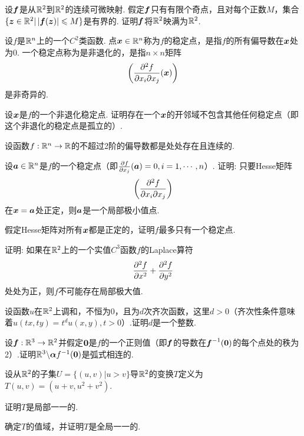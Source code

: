 \documentclass[openany,usenames,dvipsnames]{ctexbook}
\begin{document}
\begin{example}
  设$\boldsymbol f$是从$\mathbb R^2$到$\mathbb R^2$的连续可微映射. 假定$\boldsymbol f$只有有限个奇点，且对每个正数$M$，集合$\{\boldsymbol z\in\mathbb R^2|\,|\boldsymbol f(\boldsymbol z)|\leqslant M\}$是有界的. 证明$\boldsymbol f$将$\mathbb R^2$映满为$\mathbb R^2$.
\end{example}

\begin{example}
  设$f$是$\mathbb R^n$上的一个$C^2$类函数. 点$\boldsymbol x\in\mathbb R^n$称为$f$的稳定点，是指$f$的所有偏导数在$\boldsymbol x$处为0. 一个稳定点称为是非退化的，是指$n\times n$矩阵
  \[
    \bigg( \frac{\partial^2 f}{\partial x_i\partial x_j}(\boldsymbol x) \bigg)
  \]
  是非奇异的.

  设$\boldsymbol x$是$f$的一个非退化稳定点. 证明存在一个$\boldsymbol x$的开邻域不包含其他任何稳定点（即这个非退化的稳定点是孤立的）.
\end{example}

\begin{example}
  设函数$f:\mathbb R^n\to\mathbb R$的不超过2阶的偏导数都是处处存在且连续的.
  \begin{eenum}
    \item 设$\boldsymbol a\in\mathbb R^n$是$f$的一个稳定点（即$\frac{\partial f}{\partial x_j}(\boldsymbol a)=0,i=1,\cdots,n$）. 证明: 只要Hesse矩阵
        \[
          \bigg( \frac{\partial^2 f}{\partial x_i\partial x_j} \bigg)
        \]
    在$\boldsymbol x=\boldsymbol a$处正定，则$\boldsymbol a$是一个局部极小值点.
    \item 假定Hesse矩阵对所有$\boldsymbol x$都是正定的，证明$f$最多只有一个稳定点.
  \end{eenum}
\end{example}

\begin{example}
  证明: 如果在$\mathbb R^2$上的一个实值$C^3$函数$f$的Laplace算符
  \[
    \frac{\partial^2 f}{\partial x^2}+\frac{\partial^2 f}{\partial y^2}
  \]
  处处为正，则$f$不可能存在局部极大值.
\end{example}

\begin{example}
  设函数$u$在$\mathbb R^2$上调和，不恒为0，且为$d$次齐次函数，这里$d>0$（齐次性条件意味着$u(tx,ty)=t^du(x,y),t>0$）.证明$d$是一个整数.
\end{example}

\begin{example}
  设$\boldsymbol f:\mathbb R^3\to\mathbb R^2$并假定$\boldsymbol 0$是$f$的一个正则值（即$\boldsymbol f$的导数在$\boldsymbol f^{-1}(\boldsymbol 0)$的每个点处的秩为2）.证明$\mathbb R^3\backslash \boldsymbol \alpha f^{-1}(\boldsymbol 0)$是弧式相连的.
\end{example}

\begin{example}
  设从$\mathbb R^2$的子集$U=\{(u,v)|u>v\}$导$\mathbb R^2$的变换$T$定义为$T(u,v)=(u+v,u^2+v^2)$.
  \begin{eenum}
    \item 证明$T$是局部一一的.
    \item 确定$T$的值域，并证明$T$是全局一一的.
  \end{eenum}
\end{example}
\end{document}
